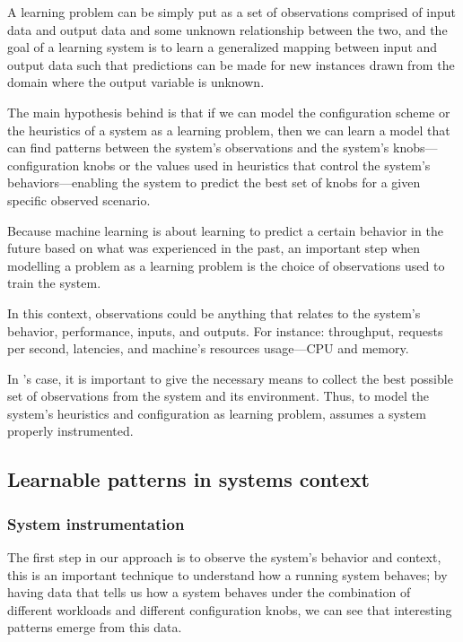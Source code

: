 A learning problem can be simply put as a set of observations comprised of input data and output data and some unknown relationship between the two, and the goal of a learning system is to learn a generalized mapping between input and output data such that predictions can be made for new instances drawn from the domain where the output variable is unknown.

The main hypothesis behind \projectname{} is that if we can model the configuration scheme or the heuristics of a system as a learning problem, then we can learn a model that can find patterns between the system's observations and the system's knobs---configuration knobs or the values used in heuristics that control the system's behaviors---enabling the system to predict the best set of knobs for a given specific observed scenario.

Because machine learning is about learning to predict a certain behavior in the future based on what was experienced in the past, an important step when modelling a problem as a learning problem is the choice of observations used to train the system.

In this context, observations could be anything that relates to the system's behavior, performance, inputs, and outputs. For instance: throughput, requests per second, latencies, and machine's resources usage---CPU and memory.

In \projectname{}'s case, it is important to give the necessary means to collect the best possible set of observations from the system and its environment. Thus, to model the system's heuristics and configuration as learning problem, \projectname{} assumes a system properly instrumented.

\subsection{Learnable patterns in systems context}

\subsubsection{System instrumentation}

The first step in our approach is to observe the system's behavior and context, this is an important technique to understand how a running system behaves; by having data that tells us how a system behaves under the combination of different workloads and different configuration knobs, we can see that interesting patterns emerge from this data.

